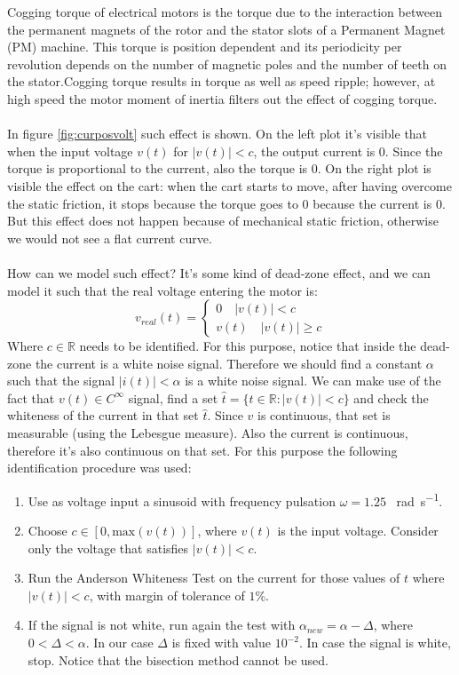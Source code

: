 Cogging torque of electrical motors is the torque due to the interaction between the permanent magnets of the rotor and the stator slots of a Permanent Magnet (PM) machine. This torque is position dependent and its periodicity per revolution depends on the number of magnetic poles and the number of teeth on the stator.Cogging torque results in torque as well as speed ripple; however, at high speed the motor moment of inertia filters out the effect of cogging torque.
\\ \\
In figure \ref{fig:curposvolt} such effect is shown. On the left plot it's visible that when the input voltage $v(t)$ for $|v(t)|< c$, the output current is $0$. Since the torque is proportional to the current, also the torque is $0$. On the right plot is visible the effect on the cart: when the cart starts to move, after having overcome the static friction, it stops because the torque goes to $0$ because the current is $0$. But this effect does not happen because of mechanical static friction, otherwise we would not see a flat current curve.  \\ \\
How can we model such effect? It's some kind of dead-zone effect, and we can model it such that the real voltage entering the motor is:
\begin{equation}
v_{real}(t) = \begin{cases}
0 \quad |v(t)| < c \\
v(t) \quad |v(t)| \geq c
\end{cases}
\end{equation}
Where $c \in \mathbb{R}$ needs to be identified. For this purpose, notice that inside the dead-zone the current is a white noise signal. Therefore we should find a constant $\alpha$ such that the signal $|i(t)| < \alpha$ is a white noise signal. We can make use of the fact that $v(t) \in C^{\infty}$ signal, find a set $\hat{t} = \{ t \in \mathbb{R}: |v(t)| < c \}$ and check the whiteness of the current in that set $\hat{t}$. Since $v$ is continuous, that set is measurable (using the Lebesgue measure). Also the current is continuous, therefore it's also continuous on that set. For this purpose the following identification procedure was used:
\begin{enumerate}
\item Use as voltage input a sinusoid with frequency pulsation $\omega = 1.25$ \SI{}{\radian \per \second}. 
\item Choose $c \in [0, \text{max}(v(t))]$, where $v(t)$ is the input voltage. Consider only the voltage that satisfies $|v(t)| < c$.
\item Run the Anderson Whiteness Test on the current for those values of $t$ where $|v(t)|<c$, with margin of tolerance of $1$\%.
\item {If the signal is not white, run again the test with $\alpha_{new}=\alpha-\Delta$,  where $0<\Delta < \alpha$. In our case $\Delta$ is fixed with value $10^{-2}$. In case the signal is white, stop. Notice that the bisection method cannot be used.}
\end{enumerate}
